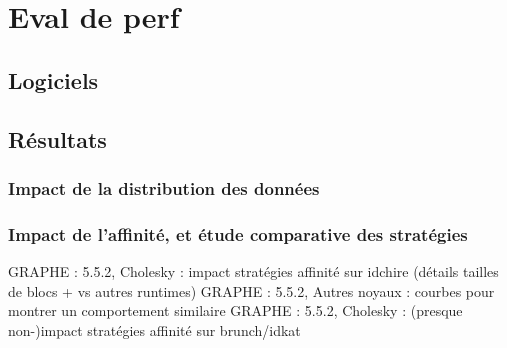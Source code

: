 \section{Eval de perf}\label{sec:contribs:perf_eval}
\subsection{Logiciels}
\subsection{Résultats}

\subsubsection{Impact de la distribution des données}

\subsubsection{Impact de l'affinité, et étude comparative des stratégies}

GRAPHE : 5.5.2, Cholesky : impact stratégies affinité sur idchire (détails tailles de blocs + vs autres runtimes)
GRAPHE : 5.5.2, Autres noyaux : courbes pour montrer un comportement similaire
GRAPHE : 5.5.2, Cholesky : (presque non-)impact stratégies affinité sur brunch/idkat


